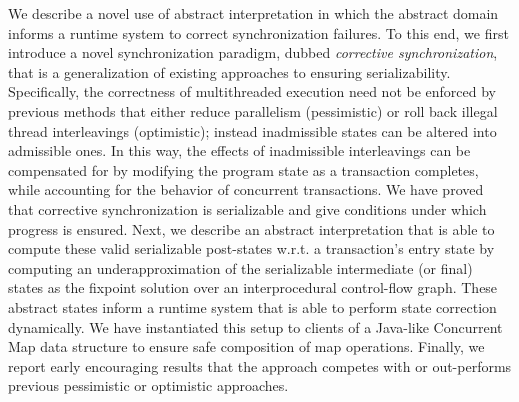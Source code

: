 We describe a novel use of abstract interpretation in which the
abstract domain informs a runtime system to correct synchronization
failures. To this end, we first introduce a novel synchronization paradigm,
dubbed \emph{corrective synchronization},
that is a generalization of existing approaches to ensuring serializability.
%
Specifically, the correctness of multithreaded execution need not be
enforced by previous methods that either reduce parallelism
(pessimistic) or roll back illegal thread interleavings (optimistic);
instead inadmissible states can be altered into admissible ones.
%
In this way, the effects of inadmissible interleavings can be
compensated for by modifying the program state as a transaction
completes, while accounting for the behavior of concurrent
transactions.
%
We have proved that corrective
synchronization is serializable and give conditions under which
progress is ensured. Next, we describe an abstract
interpretation that is able to compute these valid serializable
post-states w.r.t. a transaction's entry state by computing
an underapproximation of the serializable intermediate (or final) states
as the fixpoint solution over an interprocedural control-flow graph.
%
These abstract states
inform a runtime system that is able to perform state correction
dynamically. We have instantiated this setup to clients of a Java-like
Concurrent Map data structure to ensure safe composition of map
operations. Finally, we report early encouraging results that the
approach competes with or out-performs previous pessimistic or
optimistic approaches.
